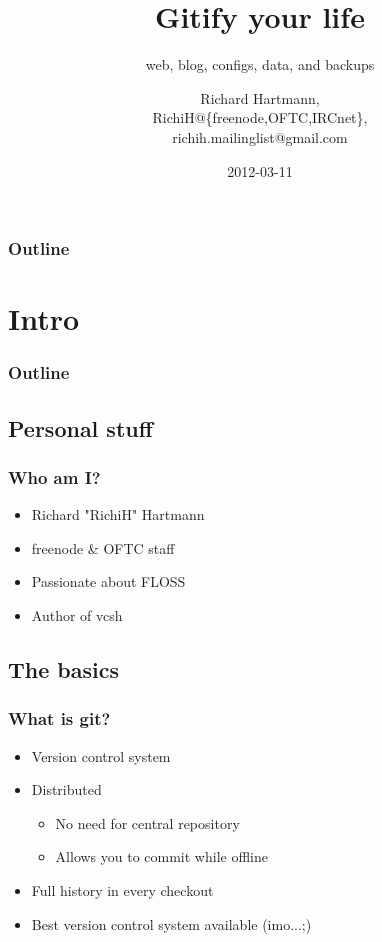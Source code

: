 \documentclass[t]{beamer}
\title{Gitify your life}
\subtitle{web, blog, configs, data, and backups}
\author{Richard Hartmann,\\
RichiH@\{freenode,OFTC,IRCnet\},\\
richih.mailinglist@gmail.com}
\date{2012-03-11}
\begin{document}
\setcounter{tocdepth}{1}

\begin{frame}
	\titlepage
\end{frame}

\begin{frame}
	\frametitle{Outline}
	\tableofcontents
\end{frame}


\section{Intro}

\begin{frame}
	\frametitle{Outline}
	\tableofcontents[currentsection]
\end{frame}

\subsection{Personal stuff}

\begin{frame}
	\frametitle{Who am I?}
	\begin{itemize}
		\item Richard "RichiH" Hartmann
		\item freenode \& OFTC staff
		\item Passionate about FLOSS
		\item Author of vcsh
	\end{itemize}
\end{frame}

\subsection{The basics}

\begin{frame}
	\frametitle{What is git?}
	\begin{itemize}
		\item Version control system
		\item Distributed
		\begin{itemize}
			\item No need for central repository
			\item Allows you to commit while offline
		\end{itemize}
		\item Full history in every checkout
		\item Best version control system available (imo...;)
	\end{itemize}
\end{frame}
\end{document}
